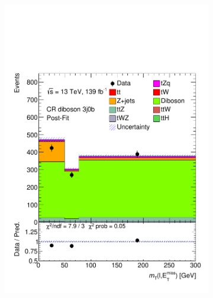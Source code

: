 \begin{figure}[!h]
\begin{subfigure}[b]{0.33\linewidth}
    \includegraphics[width=\textwidth]{ubonn-thesis/Chapters/Chapters_08/appendix/data/CR_3j0b_postFit.pdf} 
    \caption{}
  \end{subfigure}%
  \newline
  \centering
  \begin{subfigure}[b]{0.33\linewidth}

\end{subfigure}
\end{figure}
